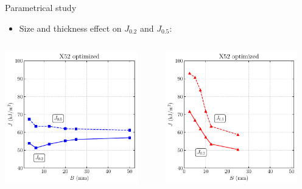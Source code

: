 \documentclass[9pt]{beamer}
\begin{document}
\begin{frame}{Parametrical study}

    \begin{itemize}
        \item Size and thickness effect on $J_{0.2}$ and $J_{0.5}$:
    \end{itemize}

    \vspace{0.3cm}

    \begin{columns}
        \centering
        \includegraphics[width=0.9\textwidth]{Images/plot_geoJ_homo_1_2__1_4.pdf}
        
        \centering
        \includegraphics[width=0.9\textwidth]{Images/plot_geoJ_12_5_1_2__1_4.pdf}
    \end{columns}


\end{frame}
\end{document}
